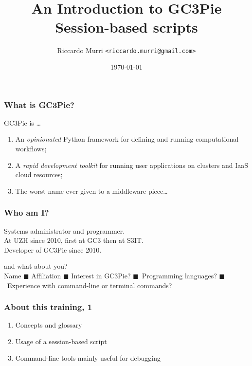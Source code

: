 \documentclass[english,serif,mathserif,usenames,dvipsnames]{beamer}
\begin{document}
\title[GC3Pie Tools]{An Introduction to GC3Pie Session-based scripts}
\author{Riccardo Murri \texttt{<riccardo.murri@gmail.com>}}
\date{\today}

\maketitle

%

\begin{frame}
  \frametitle{What is GC3Pie?}
  GC3Pie is \ldots
  \begin{enumerate}
  \item An \emph{opinionated} Python framework for defining and running computational workflows;
  \item \alert<2>{A \emph{rapid development toolkit} for running user applications on clusters and IaaS cloud resources;}
  \item The worst name ever given to a middleware piece\ldots
  \end{enumerate}

  \+
\end{frame}


\begin{frame}
  \frametitle{Who am I?}
  \begin{center}
    Systems administrator and programmer.
    \\ \+
    At UZH since 2010, first at GC3 then at S3IT.
    \\ \+
    Developer of GC3Pie since 2010.
  \end{center}
\end{frame}


\begin{frame}
  \begin{center}
    {\Huge and what about you?}
    \\ \+ \+
    \small
    Name $\blacksquare$ Affiliation $\blacksquare$ Interest in GC3Pie?
    $\blacksquare$~Programming languages?
    $\blacksquare$~Experience with command-line or terminal commands?
  \end{center}
\end{frame}


\begin{frame}
  \frametitle{About this training, 1}
  \begin{enumerate}
  \item Concepts and glossary
  \item Usage of a session-based script
  \item Command-line tools mainly useful for debugging
  \end{enumerate}
\end{frame}
\end{document}
